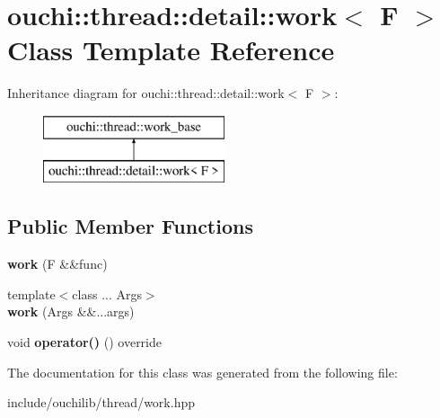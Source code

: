 \hypertarget{classouchi_1_1thread_1_1detail_1_1work}{}\section{ouchi\+::thread\+::detail\+::work$<$ F $>$ Class Template Reference}
\label{classouchi_1_1thread_1_1detail_1_1work}
Inheritance diagram for ouchi\+::thread\+::detail\+::work$<$ F $>$\+:\begin{figure}[H]
\begin{center}
\leavevmode
\includegraphics[height=2.000000cm]{classouchi_1_1thread_1_1detail_1_1work}
\end{center}
\end{figure}
\subsection*{Public Member Functions}
\begin{DoxyCompactItemize}
\item 
\mbox{\label{classouchi_1_1thread_1_1detail_1_1work_af4c86826381c3dfef497e42fb389cd06}} 
{\bfseries work} (F \&\&func)
\item 
\mbox{\label{classouchi_1_1thread_1_1detail_1_1work_a2e8747a525b22e5f4c10344c7f11e625}} 
{\footnotesize template$<$class ... Args$>$ }\\{\bfseries work} (Args \&\&...args)
\item 
\mbox{\label{classouchi_1_1thread_1_1detail_1_1work_a2f06dd9b72da5d886702dd07ac971709}} 
void {\bfseries operator()} () override
\end{DoxyCompactItemize}


The documentation for this class was generated from the following file\+:\begin{DoxyCompactItemize}
\item 
include/ouchilib/thread/work.\+hpp\end{DoxyCompactItemize}
